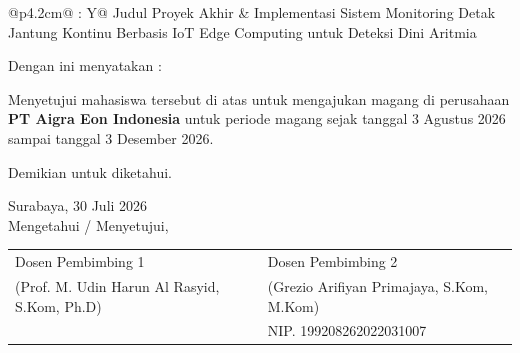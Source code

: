 \documentclass[12pt]{article}
\newcommand{\NamaPembimbingSatu}{Prof. M. Udin Harun Al Rasyid, S.Kom, Ph.D}
\newcommand{\NipPembimbingSatu}{198108082005011001}
\newcommand{\NamaPembimbingDua}{Grezio Arifiyan Primajaya, S.Kom, M.Kom}
\newcommand{\NipPembimbingDua}{199208262022031007}
\newcommand{\JudulProyekAkhir}{Implementasi Sistem Monitoring Detak Jantung Kontinu Berbasis IoT Edge Computing untuk Deteksi Dini Aritmia}
\newcommand{\NamaPerusahaan}{PT Aigra Eon Indonesia}
\newcommand{\TanggalMulai}{3 Agustus 2026}
\newcommand{\TanggalSelesai}{3 Desember 2026}
\newcommand{\TanggalSurat}{30 Juli 2026}
\begin{document}
\vspace{4pt}

\noindent
\begin{tabularx}{\textwidth}{@{}p{4.2cm}@{ : }Y@{}}
Judul Proyek Akhir & \JudulProyekAkhir \\
\end{tabularx}

\vspace{0.5cm}

\noindent Dengan ini menyatakan :

\vspace{0.2cm}

\noindent
Menyetujui mahasiswa tersebut di atas untuk mengajukan magang di perusahaan
\textbf{\NamaPerusahaan} untuk periode magang sejak tanggal \TanggalMulai{}
sampai tanggal \TanggalSelesai.

\vspace{0.3cm}

\noindent Demikian untuk diketahui.

\vspace{1cm}

\begin{center}
Surabaya, \TanggalSurat\\
Mengetahui / Menyetujui,
\end{center}

\vspace{0.5cm}

\noindent
\begin{tabularx}{\textwidth}{@{}>{\centering\arraybackslash}X >{\centering\arraybackslash}X@{}}
Dosen Pembimbing 1 & Dosen Pembimbing 2 \\[2.2cm]
(\NamaPembimbingSatu) & (\NamaPembimbingDua) \\
{\small NIP. \NipPembimbingSatu} & {\small NIP. \NipPembimbingDua} \\
\end{tabularx}
\end{document}
